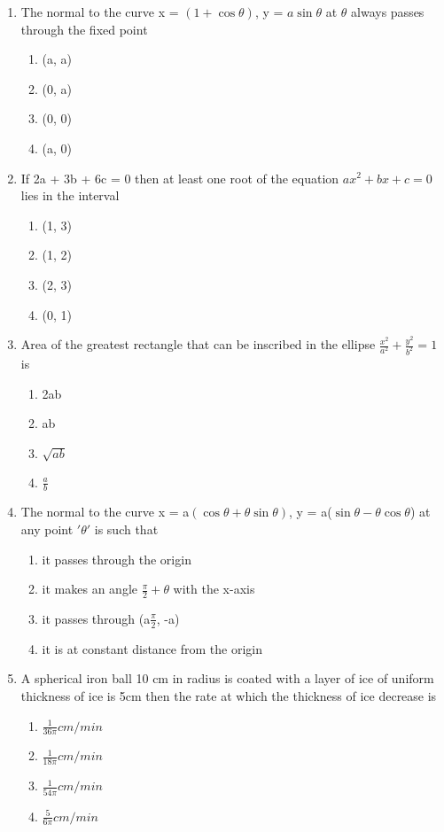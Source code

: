 \begin{enumerate}[label=\arabic*.,ref=\thesubsection.\theenumi]
\item The normal to the curve x = $(1 + \cos \theta)$, y = $a\sin \theta$ at $\theta$ always passes through the fixed point 
\begin{enumerate}
\item (a, a)
\item (0, a)
\item (0, 0)
\item (a, 0)
\end{enumerate}

\item If 2a + 3b + 6c = 0 then at least one root of the equation $ax^2 + bx + c = 0$ lies in the interval
\begin{enumerate}
\item (1, 3)
\item (1, 2)
\item (2, 3)
\item (0, 1)
\end{enumerate}

\item Area of the greatest rectangle that can be inscribed in the ellipse $\frac{x^2}{a^2} + \frac{y^2}{b^2} = 1$ is 
\begin{enumerate}
\item 2ab
\item ab
\item $\sqrt{ab}$
\item $\frac{a}{b}$
\end{enumerate}

\item The normal to the curve x = a$(\cos \theta + \theta \sin \theta)$, y = a($\sin \theta - \theta \cos \theta$) at any point $'\theta'$ is such that
\begin{enumerate}
\item it passes through the origin 
\item it makes an angle $\frac{\pi}{2} + \theta$ with the x-axis
\item it passes through (a$\frac{\pi}{2}$, -a)
\item it is at constant distance from the origin
\end{enumerate}

\item A spherical iron ball 10 cm in radius is coated with a layer of ice of uniform thickness of ice is 5cm then the rate at which the thickness of ice decrease is 
\begin{enumerate}
\item $\frac{1}{36\pi} cm/min$
\item $\frac{1}{18\pi} cm/min$
\item $\frac{1}{54\pi} cm/min$
\item $\frac{5}{6\pi} cm/min$
\end{enumerate}


\end{enumerate}
